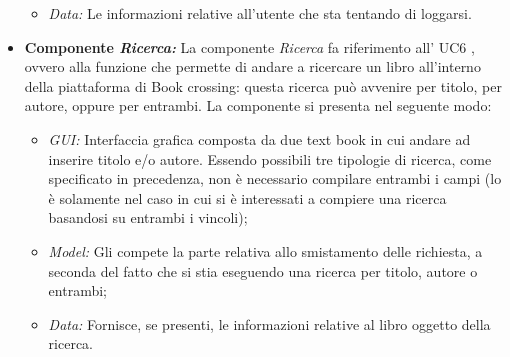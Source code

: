 \begin{itemize}
\begin{itemize}
		\item \textit{Data:} Le informazioni relative all'utente che sta tentando di loggarsi.
	\end{itemize}
	\item \textbf{Componente \textit{Ricerca:}}  La componente \textit{Ricerca} fa riferimento all’ UC6 
	, ovvero alla funzione che permette di andare a ricercare un libro all'interno della piattaforma di Book crossing: questa ricerca può avvenire per titolo, per autore, oppure per entrambi. La componente si presenta nel seguente modo:
	\begin{itemize}
	\item \textit{GUI:} Interfaccia grafica composta da due text book in cui andare ad inserire titolo e/o autore. Essendo possibili tre tipologie di ricerca, come specificato in precedenza, non è necessario compilare entrambi i campi (lo è solamente nel caso in cui si è interessati a compiere una ricerca basandosi su entrambi i vincoli);
	\item \textit{Model:} Gli compete la parte relativa allo smistamento delle richiesta, a seconda del fatto che si stia eseguendo una ricerca per titolo, autore o entrambi;
	\item \textit{Data:} Fornisce, se presenti, le informazioni relative al libro oggetto della ricerca.
	\end{itemize}
\end{itemize}